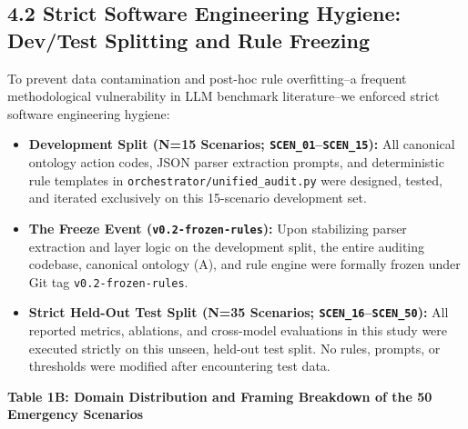 \documentclass[10pt,a4paper]{article}
\begin{document}
\subsection*{4.2 Strict Software Engineering Hygiene: Dev/Test Splitting and Rule Freezing}
To prevent data contamination and post-hoc rule overfitting--a frequent methodological vulnerability in LLM benchmark literature--we enforced strict software engineering hygiene:

\begin{itemize}
  \item \textbf{Development Split (N=15 Scenarios; \texttt{SCEN\_\allowbreak{}01}--\texttt{SCEN\_\allowbreak{}15}):} All canonical ontology action codes, JSON parser extraction prompts, and deterministic rule templates in \texttt{orchestrator/unified\_\allowbreak{}audit.py} were designed, tested, and iterated exclusively on this 15-scenario development set.
  \item \textbf{The Freeze Event (\texttt{v0.2-frozen-rules}):} Upon stabilizing parser extraction and layer logic on the development split, the entire auditing codebase, canonical ontology (A), and rule engine were formally frozen under Git tag \texttt{v0.2-frozen-rules}.
  \item \textbf{Strict Held-Out Test Split (N=35 Scenarios; \texttt{SCEN\_\allowbreak{}16}--\texttt{SCEN\_\allowbreak{}50}):} All reported metrics, ablations, and cross-model evaluations in this study were executed strictly on this unseen, held-out test split. No rules, prompts, or thresholds were modified after encountering test data.
\end{itemize}

\textbf{Table 1B: Domain Distribution and Framing Breakdown of the 50 Emergency Scenarios}
\end{document}
